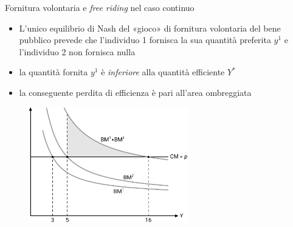 \documentclass[aspectratio=64,12pt]{beamer}
\begin{document}
\begin{frame}{Fornitura volontaria e \emph{free riding} nel caso continuo}
\begin{itemize}
\item L'unico equilibrio di Nash del «gioco» di fornitura volontaria del bene
pubblico prevede che l'individuo 1 fornisca la sua quantità preferita
$y^{1}$ e l'individuo 2 non fornisca nulla
\item la quantità fornita $y^{1}$ è \emph{inferiore} alla quantità efficiente $Y^{*}$
\item la conseguente perdita di efficienza è pari all'area ombreggiata
\end{itemize}

\begin{figure}[htbp]
\centering
\includegraphics[height=5cm]{./figure/bene-pubblico-equilibrio.pdf}
\end{figure} 
\end{frame}
\end{document}
